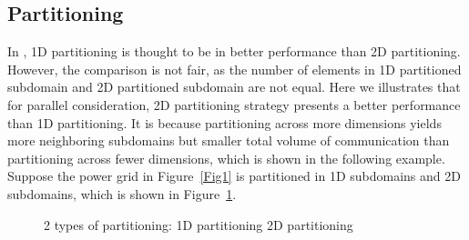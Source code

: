 \documentclass{sig-alternate}
\begin{document}
  \subsection{Partitioning}
	In \cite{Zhongyu}, 1D partitioning is thought to be in better performance than 2D partitioning. However, the comparison is not 
	fair, as the number of elements in 1D partitioned subdomain and 2D partitioned subdomain are not equal. Here we illustrates that
	for parallel consideration, 2D partitioning strategy presents a better performance than 1D partitioning. It is because 
	partitioning across more dimensions yields more neighboring subdomains but smaller total volume of communication than 
	partitioning across fewer dimensions, which is shown in the following example.\\

	Suppose the power grid in Figure~\ref{Fig1} is partitioned in 1D subdomains and 2D subdomains, which is shown in 
	Figure~\ref{Fig3}.
	\begin{figure}[htbp]
	  \caption{2 types of partitioning:
	   1D partitioning
	   2D partitioning }
	  \label{Fig3}
	\end{figure}
\end{document}
